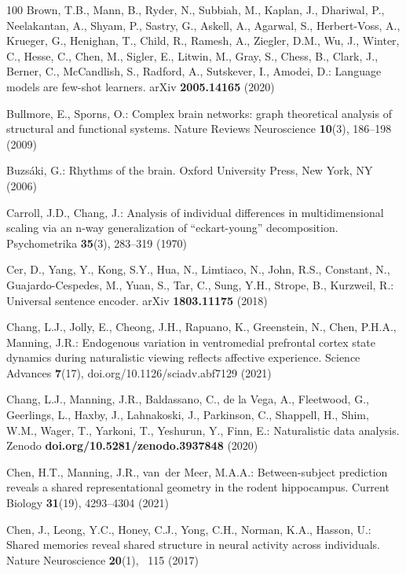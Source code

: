 \documentclass[runningheads]{llncs}
\begin{document}
\begin{thebibliography}{100}
Brown, T.B., Mann, B., Ryder, N., Subbiah, M., Kaplan, J., Dhariwal, P.,
  Neelakantan, A., Shyam, P., Sastry, G., Askell, A., Agarwal, S.,
  Herbert-Voss, A., Krueger, G., Henighan, T., Child, R., Ramesh, A., Ziegler,
  D.M., Wu, J., Winter, C., Hesse, C., Chen, M., Sigler, E., Litwin, M., Gray,
  S., Chess, B., Clark, J., Berner, C., McCandlish, S., Radford, A., Sutskever,
  I., Amodei, D.: Language models are few-shot learners. {arXiv}
  \textbf{2005.14165} (2020)

Bullmore, E., Sporns, O.: Complex brain networks: graph theoretical analysis of
  structural and functional systems. Nature Reviews Neuroscience
  \textbf{10}(3),  186--198 (2009)

Buzs\'{a}ki, G.: Rhythms of the brain. {Oxford} {University} Press, New York,
  {NY} (2006)

Carroll, J.D., Chang, J.: Analysis of individual differences in
  multidimensional scaling via an n-way generalization of ``eckart-young''
  decomposition. Psychometrika  \textbf{35}(3),  283--319 (1970)

Cer, D., Yang, Y., Kong, S.Y., Hua, N., Limtiaco, N., John, R.S., Constant, N.,
  Guajardo-Cespedes, M., Yuan, S., Tar, C., Sung, Y.H., Strope, B., Kurzweil,
  R.: Universal sentence encoder. {arXiv}  \textbf{1803.11175} (2018)

Chang, L.J., Jolly, E., Cheong, J.H., Rapuano, K., Greenstein, N., Chen,
  P.H.A., Manning, J.R.: Endogenous variation in ventromedial prefrontal cortex
  state dynamics during naturalistic viewing reflects affective experience.
  Science Advances  \textbf{7}(17),  doi.org/10.1126/sciadv.abf7129 (2021)

Chang, L.J., Manning, J.R., Baldassano, C., {de la Vega}, A., Fleetwood, G.,
  Geerlings, L., Haxby, J., Lahnakoski, J., Parkinson, C., Shappell, H., Shim,
  W.M., Wager, T., Yarkoni, T., Yeshurun, Y., Finn, E.: Naturalistic data
  analysis. Zenodo  \textbf{doi.org/10.5281/zenodo.3937848} (2020)

Chen, H.T., Manning, J.R., van~der Meer, M.A.A.: Between-subject prediction
  reveals a shared representational geometry in the rodent hippocampus. Current
  Biology  \textbf{31}(19),  4293--4304 (2021)

Chen, J., Leong, Y.C., Honey, C.J., Yong, C.H., Norman, K.A., Hasson, U.:
  Shared memories reveal shared structure in neural activity across
  individuals. Nature Neuroscience  \textbf{20}(1), ~115 (2017)


\end{thebibliography}
\end{document}
